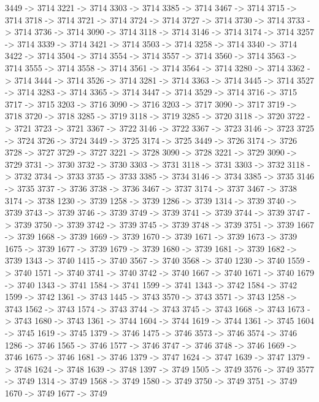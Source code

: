 {	3449 -> 3714
	3221 -> 3714
	3303 -> 3714
	3385 -> 3714
	3467 -> 3714
	3715 -> 3714
	3718 -> 3714
	3721 -> 3714
	3724 -> 3714
	3727 -> 3714
	3730 -> 3714
	3733 -> 3714
	3736 -> 3714
	3090 -> 3714
	3118 -> 3714
	3146 -> 3714
	3174 -> 3714
	3257 -> 3714
	3339 -> 3714
	3421 -> 3714
	3503 -> 3714
	3258 -> 3714
	3340 -> 3714
	3422 -> 3714
	3504 -> 3714
	3554 -> 3714
	3557 -> 3714
	3560 -> 3714
	3563 -> 3714
	3555 -> 3714
	3558 -> 3714
	3561 -> 3714
	3564 -> 3714
	3280 -> 3714
	3362 -> 3714
	3444 -> 3714
	3526 -> 3714
	3281 -> 3714
	3363 -> 3714
	3445 -> 3714
	3527 -> 3714
	3283 -> 3714
	3365 -> 3714
	3447 -> 3714
	3529 -> 3714
	3716 -> 3715
	3717 -> 3715
	3203 -> 3716
	3090 -> 3716
	3203 -> 3717
	3090 -> 3717
	3719 -> 3718
	3720 -> 3718
	3285 -> 3719
	3118 -> 3719
	3285 -> 3720
	3118 -> 3720
	3722 -> 3721
	3723 -> 3721
	3367 -> 3722
	3146 -> 3722
	3367 -> 3723
	3146 -> 3723
	3725 -> 3724
	3726 -> 3724
	3449 -> 3725
	3174 -> 3725
	3449 -> 3726
	3174 -> 3726
	3728 -> 3727
	3729 -> 3727
	3221 -> 3728
	3090 -> 3728
	3221 -> 3729
	3090 -> 3729
	3731 -> 3730
	3732 -> 3730
	3303 -> 3731
	3118 -> 3731
	3303 -> 3732
	3118 -> 3732
	3734 -> 3733
	3735 -> 3733
	3385 -> 3734
	3146 -> 3734
	3385 -> 3735
	3146 -> 3735
	3737 -> 3736
	3738 -> 3736
	3467 -> 3737
	3174 -> 3737
	3467 -> 3738
	3174 -> 3738
	1230 -> 3739
	1258 -> 3739
	1286 -> 3739
	1314 -> 3739
	3740 -> 3739
	3743 -> 3739
	3746 -> 3739
	3749 -> 3739
	3741 -> 3739
	3744 -> 3739
	3747 -> 3739
	3750 -> 3739
	3742 -> 3739
	3745 -> 3739
	3748 -> 3739
	3751 -> 3739
	1667 -> 3739
	1668 -> 3739
	1669 -> 3739
	1670 -> 3739
	1671 -> 3739
	1673 -> 3739
	1675 -> 3739
	1677 -> 3739
	1679 -> 3739
	1680 -> 3739
	1681 -> 3739
	1682 -> 3739
	1343 -> 3740
	1415 -> 3740
	3567 -> 3740
	3568 -> 3740
	1230 -> 3740
	1559 -> 3740
	1571 -> 3740
	3741 -> 3740
	3742 -> 3740
	1667 -> 3740
	1671 -> 3740
	1679 -> 3740
	1343 -> 3741
	1584 -> 3741
	1599 -> 3741
	1343 -> 3742
	1584 -> 3742
	1599 -> 3742
	1361 -> 3743
	1445 -> 3743
	3570 -> 3743
	3571 -> 3743
	1258 -> 3743
	1562 -> 3743
	1574 -> 3743
	3744 -> 3743
	3745 -> 3743
	1668 -> 3743
	1673 -> 3743
	1680 -> 3743
	1361 -> 3744
	1604 -> 3744
	1619 -> 3744
	1361 -> 3745
	1604 -> 3745
	1619 -> 3745
	1379 -> 3746
	1475 -> 3746
	3573 -> 3746
	3574 -> 3746
	1286 -> 3746
	1565 -> 3746
	1577 -> 3746
	3747 -> 3746
	3748 -> 3746
	1669 -> 3746
	1675 -> 3746
	1681 -> 3746
	1379 -> 3747
	1624 -> 3747
	1639 -> 3747
	1379 -> 3748
	1624 -> 3748
	1639 -> 3748
	1397 -> 3749
	1505 -> 3749
	3576 -> 3749
	3577 -> 3749
	1314 -> 3749
	1568 -> 3749
	1580 -> 3749
	3750 -> 3749
	3751 -> 3749
	1670 -> 3749
	1677 -> 3749
}
